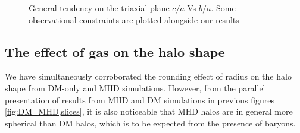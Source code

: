 \begin{figure}[!ht]
  \centering
  \hfill
  \hfill
  \caption{General tendency on the triaxial plane $c/a$ Vs $b/a$. Some observational constraints are plotted alongside our results}
    \label{fig:Triaxiality_Inner_Outer}
\end{figure}

\subsection{The effect of gas on the halo shape}
We have simultaneously corroborated the rounding effect of radius on the halo shape from DM-only and MHD simulations. However, from the parallel presentation of results from MHD and DM simulations in previous figures \ref{fig:DM_MHD,slices}, it is also noticeable that MHD halos are in general more spherical than DM halos, which is to be expected from the presence of baryons\cite{Barnes_and_Hernquist_1996,Springel_et_al._2004,Bryan_et_al._2013}.\\

